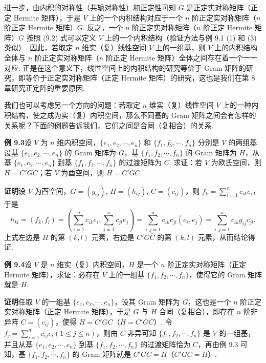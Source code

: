 \documentclass[UTF8, 12pt, fontset=fandol, oneside]{ctexart}
\begin{document}
进一步，由内积的对称性（共轭对称性）和正定性可知 $G$ 是正定实对称矩阵（正定 Hermite 矩阵），于是 $V$ 上的一个内积结构对应于一个 $n$ 阶正定实对称矩阵（$n$ 阶正定 Hermite 矩阵）$G$. 反之，一个 $n$ 阶正定实对称矩阵（$n$ 阶正定 Hermite 矩阵）$G$ 按照 (9.2) 式可以定义 $V$ 上的一个内积结构（验证方法与例 9.1 (1) 和 (3) 类似）. 因此，若取定 $n$ 维实（复）线性空间 $V$ 上的一组基，则 $V$ 上的内积结构全体与 $n$ 阶正定实对称矩阵（$n$ 阶正定 Hermite 矩阵）全体之间存在着一个一一对应. 正是在这个意义下，线性空间上的内积结构的研究等价于 Gram 矩阵的研究，即等价于正定实对称矩阵（正定 Hermite 矩阵）的研究，这也是我们在第 8 章研究正定阵的重要原因.

我们也可以考虑另一个方向的问题：若取定 $n$ 维实（复）线性空间 $V$ 上的一种内积结构，使之成为实（复）内积空间，那么不同基的 Gram 矩阵之间会有怎样的关系呢？下面的例题告诉我们，它们之间是合同（复相合）的关系.

\noindent\textbf{例 9.3}\quad 设 $V$ 为 $n$ 维内积空间，$\{e_1,e_2,\cdots,e_n\}$ 和 $\{f_1,f_2,\cdots,f_n\}$ 分别是 $V$ 的两组基. 设基 $\{e_1,e_2,\cdots,e_n\}$ 的 Gram 矩阵为 $G$，基 $\{f_1,f_2,\cdots,f_n\}$ 的 Gram 矩阵为 $H$，从基 $\{e_1,e_2,\cdots,e_n\}$ 到基 $\{f_1,f_2,\cdots,f_n\}$ 的过渡矩阵为 $C$. 求证：若 $V$ 为欧氏空间，则 $H=C'GC$；若 $V$ 为酉空间，则 $H=C'G\overline{C}$.

\noindent\textbf{证明}\quad 设 $V$ 为酉空间，$G=(g_{ij})$, $H=(h_{ij})$, $C=(c_{ij})$，则 $f_k=\sum_{i=1}^n c_{ik}e_i$，于是
\[
h_{kl}=(f_k,f_l)=\left(\sum_{i=1}^n c_{ik}e_i,\sum_{j=1}^n c_{jl}e_j\right)
=\sum_{i,j=1}^n c_{ik}\overline{c_{jl}}(e_i,e_j)
=\sum_{i,j=1}^n c_{ik}g_{ij}\overline{c_{jl}}.
\]
上式左边是 $H$ 的第 $(k,l)$ 元素，右边是 $C'G\overline{C}$ 的第 $(k,l)$ 元素，从而结论得证.

\noindent\textbf{例 9.4}\quad 设 $V$ 是 $n$ 维实（复）内积空间，$H$ 是一个 $n$ 阶正定实对称矩阵（正定 Hermite 矩阵），求证：必存在 $V$ 上的一组基 $\{f_1,f_2,\cdots,f_n\}$，使得它的 Gram 矩阵就是 $H$.

\noindent\textbf{证明}\quad 任取 $V$ 的一组基 $\{e_1,e_2,\cdots,e_n\}$，设其 Gram 矩阵为 $G$，这也是一个 $n$ 阶正定实对称矩阵（正定 Hermite 矩阵），于是 $G$ 与 $H$ 合同（复相合），即存在 $n$ 阶非异阵 $C=(c_{ij})$，使得 $H=C'GC$（$H=C'G\overline{C}$）. 令 $f_j=\sum_{i=1}^n c_{ij}e_i(1\le j\le n)$，则由 $C$ 非异可知 $\{f_1,f_2,\cdots,f_n\}$ 是 $V$ 的一组基，并且从基 $\{e_1,e_2,\cdots,e_n\}$ 到基 $\{f_1,f_2,\cdots,f_n\}$ 的过渡矩阵恰为 $C$，再由例 9.3 可知，基 $\{f_1,f_2,\cdots,f_n\}$ 的 Gram 矩阵就是 $C'GC=H$（$C'G\overline{C}=H$）.
\end{document}
